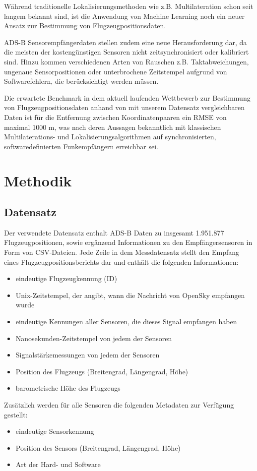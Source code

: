 \documentclass{svproc}
\begin{document}
 Während traditionelle Lokalisierungsmethoden wie z.B. Multilateration schon seit langem bekannt sind, ist die Anwendung von Machine Learning noch ein neuer Ansatz zur Bestimmung von Flugzeugpositionsdaten. \cite{competition}

 ADS-B Sensorempfängerdaten stellen zudem eine neue Herausforderung dar, da die meisten der kostengünstigen Sensoren nicht zeitsynchronisiert oder kalibriert sind. Hinzu kommen verschiedenen Arten von Rauschen z.B. Taktabweichungen, ungenaue Sensorpositionen oder unterbrochene Zeitstempel aufgrund von Softwarefehlern, die berücksichtigt werden müssen.\cite{competition}

 Die erwartete Benchmark in dem aktuell laufenden Wettbewerb zur Bestimmung von Flugzeugpositionsdaten anhand von mit unserem Datensatz vergleichbaren Daten ist  für die Entfernung zwischen Koordinatenpaaren ein RMSE von maximal 1000 m, was nach deren Aussagen bekanntlich mit klassischen Multilaterations- und Lokalisierungsalgorithmen auf synchronisierten, softwaredefinierten Funkempfängern erreichbar sei. \cite{competition}
%
%
\section{Methodik}
%
\subsection{Datensatz}
Der verwendete Datensatz enthalt ADS-B Daten zu insgesamt 1.951.877 Flugzeugpositionen, sowie ergänzend Informationen zu den Empfängersensoren in Form von CSV-Dateien. Jede Zeile in dem Messdatensatz stellt den Empfang eines Flugzeugpositionsberichts dar und enthält die folgenden Informationen:
\begin{itemize}
    \item eindeutige Flugzeugkennung (ID)
    \item Unix-Zeitstempel, der angibt, wann die Nachricht von OpenSky empfangen wurde
    \item eindeutige Kennungen aller Sensoren, die dieses Signal empfangen haben
    \item Nanosekunden-Zeitstempel von jedem der Sensoren
    \item Signalstärkemessungen von jedem der Sensoren
    \item Position des Flugzeugs (Breitengrad, Längengrad, Höhe)
    \item barometrische Höhe des Flugzeugs
\end{itemize}
Zusätzlich werden für alle Sensoren die folgenden Metadaten zur Verfügung gestellt:
\begin{itemize}
    \item eindeutige Sensorkennung
    \item Position des Sensors (Breitengrad, Längengrad, Höhe)
    \item Art der Hard- und Software
    \end{itemize}
\end{document}
